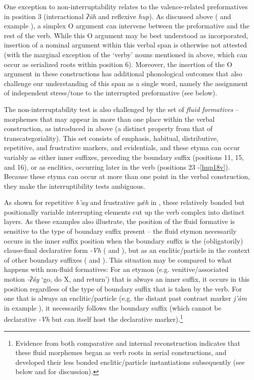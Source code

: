 \documentclass[output=paper]{langscibook}
\begin{document}
One exception to non-interruptability relates to the valence-related preformatives in position 3 (interactional \textit{ʔ\~uh} and reflexive \textit{hup}). As discussed above ( and example ), a simplex O argument can intervene between the preformative and the rest of the verb. While this O argument may be best understood as incorporated, insertion of a nominal argument within this verbal span is otherwise not attested (with the marginal exception of the `verby' nouns mentioned in  above, which can occur as serialized roots within position 6). Moreover, the insertion of the O argument in these constructions has additional phonological outcomes that also challenge our understanding of this span as a single word, namely the assignment of independent stress/tone to the interrupted preformative (see  below).

The non-interruptability test is also challenged by the set of \textit{fluid formatives} – morphemes that may appear in more than one place within the verbal construction, as introduced in  above (a distinct property from that of transcategoriality). This set consists of emphasis, habitual, distributive, repetitive, and frustrative markers, and evidentials, and these etyma can occur variably as either inner suffixes, preceding the boundary suffix (positions 11, 15, and 16), or as enclitics, occurring later in the verb (positions 23 -\ref{hup18v}). Because these etyma can occur at more than one point in the verbal construction, they make the interruptibility tests ambiguous. 

As shown for repetitive \textit{b'ay} and frustrative \textit{y\~{æ}h} in , these relatively bonded but positionally variable interrupting elements cut up the verb complex into distinct layers. As these examples also illustrate, the position of the fluid formative is sensitive to the type of boundary suffix present – the fluid etymon necessarily occurs in the inner suffix position when the boundary suffix is the (obligatorily) clause-final declarative form \textit{{}-\'{V}h }( and ), but as an enclitic/particle in the context of other boundary suffixes ( and ). This situation may be compared to what happens with non-fluid formatives: For an etymon (e.g. venitive/associated motion \textit{-ʔáy} `go, do X, and return') that is always an inner suffix, it occurs in this position regardless of the type of boundary suffix that is taken by the verb. For one that is always an enclitic/particle (e.g. the distant past contrast marker \textit{j'ám} in example ), it necessarily follows the boundary suffix (which cannot be declarative \textit{{}-\'{V}h} but can itself host the declarative marker).\footnote{Evidence from both comparative and internal reconstruction indicates that these fluid morphemes began as verb roots in serial constructions, and developed their less bonded enclitic/particle instantiations subsequently (see  below and \citealt{Epps2008} for discussion).}
\end{document}
